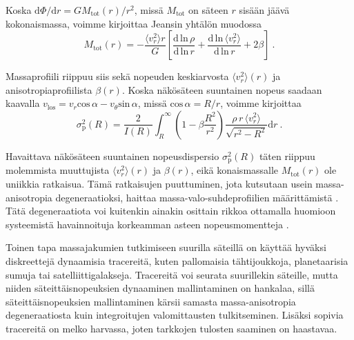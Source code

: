 \documentclass[12pt,a4paper]{article}
\begin{document}
Koska $\mathrm{d}\Phi / \mathrm{d}r = GM_\mathrm{tot}(r)/r^2$, missä $M_\mathrm{tot}$ on säteen $r$ sisään jäävä kokonaismassa, voimme kirjoittaa Jeansin yhtälön muodossa
\begin{equation} \label{jeansmassa}
M_\mathrm{tot}(r) = - \frac{\langle v_r^2 \rangle r}{G} \left[ \frac{\mathrm{d \, ln} \, \rho}{\mathrm{d \, ln} \, r} + \frac{\mathrm{d \, ln} \, \langle v_r^2 \rangle}{\mathrm{d \, ln} \, r} + 2 \beta \right] \ .
\end{equation}

Massaprofiili riippuu siis sekä nopeuden keskiarvosta $\langle v_r^2 \rangle (r)$ ja anisotropiaprofiilista $\beta(r)$. Koska näkösäteen suuntainen nopeus saadaan kaavalla $v_\mathrm{los} = v_r \mathrm{cos} \, \alpha - v_\theta \mathrm{sin} \, \alpha$, missä $\mathrm{cos} \, \alpha = R/r$, voimme kirjoittaa 
\begin{equation}
\sigma^2_\mathrm{p}(R) = \frac{2}{I(R)} \int_R^\infty \left( 1 - \beta \frac{R^2}{r^2} \right) \frac{\rho \, r \, \langle v_r^2 \rangle}{\sqrt{r^2 - R^2}} \mathrm{d} r \ .
\end{equation}

Havaittava näkösäteen suuntainen nopeusdispersio $\sigma^2_\mathrm{p}(R)$ täten riippuu molemmista muuttujista $\langle v_r^2 \rangle (r)$ ja $\beta(r)$, eikä konaismassalle $M_\mathrm{tot}(r)$ ole uniikkia ratkaisua. Tämä ratkaisujen puuttuminen, jota kutsutaan usein massa-anisotropia degeneraatioksi, haittaa massa-valo-suhdeprofiilien määrittämistä \citep{galform}. Tätä degeneraatiota voi kuitenkin ainakin osittain rikkoa ottamalla huomioon systeemistä havainnoituja korkeamman asteen nopeusmomentteja \citep{marel:1993}.

Toinen tapa massajakumien tutkimiseen suurilla säteillä on käyttää hyväksi diskreettejä dynaamisia tracereitä, kuten pallomaisia tähtijoukkoja, planetaarisia sumuja tai satelliittigalakseja. Tracereitä voi seurata suurillekin säteille, mutta niiden säteittäisnopeuksien dynaaminen mallintaminen on hankalaa, sillä säteittäisnopeuksien mallintaminen kärsii samasta massa-anisotropia degeneraatiosta kuin integroitujen valomittausten tulkitseminen. Lisäksi sopivia tracereitä on melko harvassa, joten tarkkojen tulosten saaminen on haastavaa. 
\end{document}
